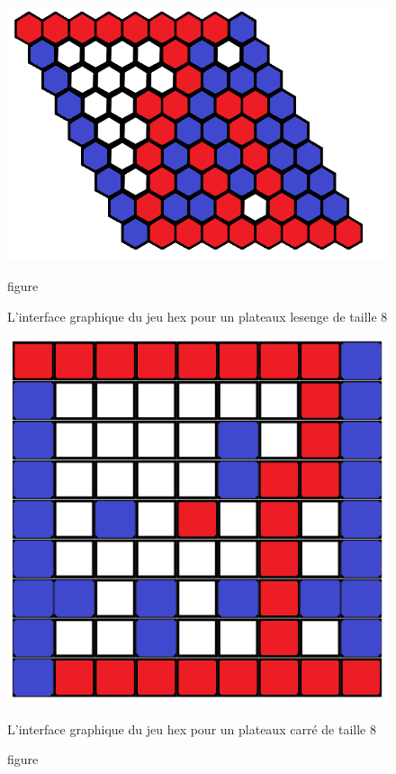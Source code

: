 \documentclass[a4paper, 12pt]{article}
\begin{document}
\begin{figure}[h!]
  \centering
  \begin{minipage}{.5\textwidth}
    \centering
    \includegraphics[width=1.1\linewidth]{./pictures/hexagonal_graphical_interface.png}
    \caption{figure}{L'interface graphique du jeu hex pour un plateaux lesenge de taille 8}
    \label{hex_board_h}
  \end{minipage}%
  \begin{minipage}{.5\textwidth}
    \centering
    \includegraphics[width=.75\linewidth]{./pictures/squared_graphical_interface.png}
    \caption{figure}{L'interface graphique du jeu hex pour un plateaux carré de taille 8}
    \label{hex_board_c}
  \end{minipage}
\end{figure}
\end{document}
